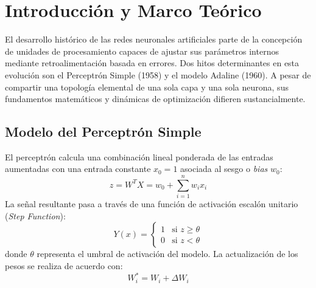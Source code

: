 \documentclass{article}
\begin{document}
\begin{abstract}
En el presente informe se describe el desarrollo, implementación y análisis comparativo de dos de los modelos de la computación neuronal: el \textbf{Perceptrón Simple} de Rosenblatt y la red \textbf{Adaline} (\textit{Adaptive Linear Neuron}) de Widrow y Hoff. Las arquitecturas fueron programadas desde cero en Python, estructurando las ejecuciones en un cuaderno interactivo de Jupyter. Se evalúa el comportamiento de ambos modelos ante compuertas lógicas canónicas ($\text{AND}$ y $\text{OR}$ de 2, 3 y 4 entradas) y ante dos conjuntos de datos multidimensionales: el dataset \textbf{Iris} (clasificación linealmente separable de \textit{Iris Setosa}) y el dataset \textbf{Banknote Authentication} (1372 instancias, 4 atributos continuos). Se analizan tres reglas de corrección de pesos para el perceptrón, el impacto del factor relativo de aprendizaje $\alpha$, la convergencia del error cuadrático medio (MSE) en Adaline, y la estabilidad del aprendizaje bajo particiones de entrenamiento y prueba de 60-40, 70-30, 80-20 y 90-10 según la metodología de muestreo de \texttt{Dataset\_train\_test.mlx}.
\end{abstract}

\vspace{0.2cm}

\section{Introducción y Marco Teórico}
El desarrollo histórico de las redes neuronales artificiales parte de la concepción de unidades de procesamiento capaces de ajustar sus parámetros internos mediante retroalimentación basada en errores. Dos hitos determinantes en esta evolución son el Perceptrón Simple (1958) y el modelo Adaline (1960). A pesar de compartir una topología elemental de una sola capa y una sola neurona, sus fundamentos matemáticos y dinámicas de optimización difieren sustancialmente.

\subsection{Modelo del Perceptrón Simple}
El perceptrón calcula una combinación lineal ponderada de las entradas aumentadas con una entrada constante $x_0 = 1$ asociada al sesgo o \textit{bias} $w_0$:
\begin{equation}
z = W^T X = w_0 + \sum_{i=1}^n w_i x_i
\end{equation}
La señal resultante pasa a través de una función de activación escalón unitario (\textit{Step Function}):
\begin{equation}
Y(x) = \begin{cases} 
1 & \text{si } z \ge \theta \\ 
0 & \text{si } z < \theta 
\end{cases}
\end{equation}
donde $\theta$ representa el umbral de activación del modelo. La actualización de los pesos se realiza de acuerdo con:
\begin{equation}
W_i^* = W_i + \Delta W_i
\end{equation}
\end{document}
